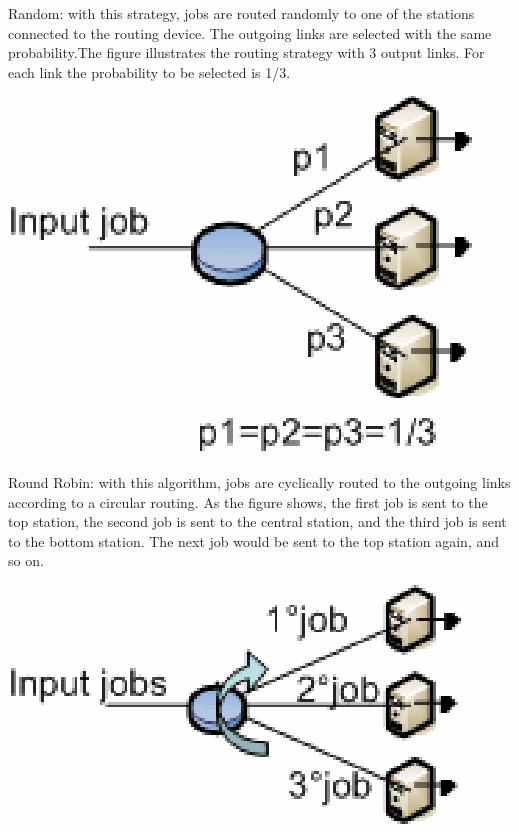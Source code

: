 \begin{description*}
\item[Random:] with this strategy, jobs are routed randomly to one of the stations connected to the routing device. The outgoing links are selected with the same probability.The figure illustrates the routing strategy with 3 output links. For each link the probability to be selected is 1/3.
\begin{center}
\includegraphics[scale=.5]{img/jsim/random.eps}
\end{center}
\item[Round Robin:] with this algorithm, jobs are cyclically routed to the outgoing links according to a circular routing. As the figure shows, the first job is sent to the top station, the second job is sent to the central station, and the third job is sent to the bottom station. The next job would be sent to the top station again, and so on.
\begin{center}
\includegraphics[scale=.5]{img/jsim/round_robin.eps}
\end{center}

\end{description*}
